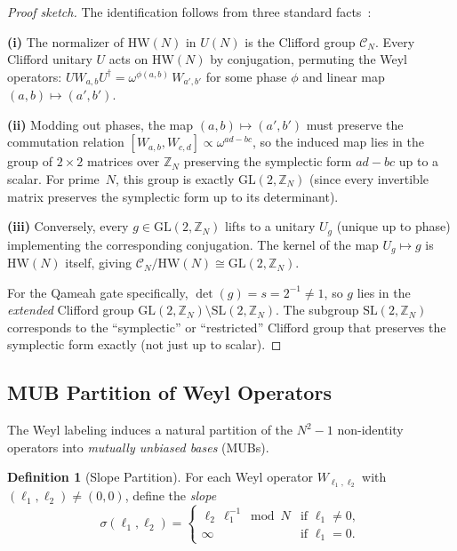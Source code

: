 \documentclass[aip,jmp,reprint,superscriptaddress,floatfix,nofootinbib]{revtex4-2}
\theoremstyle{definition}
\newtheorem{definition}[theorem]{Definition}
\theoremstyle{remark}
\newcommand{\ZN}{\mathbb{Z}_N}
\newcommand{\GL}{\mathrm{GL}}
\newcommand{\SL}{\mathrm{SL}}
\newcommand{\HW}{\mathrm{HW}}
\begin{document}
\begin{proof}[Proof sketch]
The identification follows from three standard
facts~\cite{Appleby2005, Gross2006}:

\textbf{(i)} The normalizer of $\HW(N)$ in $U(N)$ is the Clifford
group $\mathcal{C}_N$.  Every Clifford unitary $U$ acts on $\HW(N)$
by conjugation, permuting the Weyl operators: $U W_{a,b} U^\dagger =
\omega^{\phi(a,b)}\, W_{a',b'}$ for some phase $\phi$ and linear map
$(a,b) \mapsto (a',b')$.

\textbf{(ii)} Modding out phases, the map $(a,b) \mapsto (a',b')$
must preserve the commutation relation $[W_{a,b}, W_{c,d}] \propto
\omega^{ad - bc}$, so the induced map lies in the group of
$2 \times 2$ matrices over $\ZN$ preserving the symplectic form
$ad - bc$ up to a scalar.  For prime~$N$, this group is exactly
$\GL(2,\ZN)$ (since every invertible matrix preserves the symplectic
form up to its determinant).

\textbf{(iii)} Conversely, every $g \in \GL(2,\ZN)$ lifts to a
unitary $U_g$ (unique up to phase) implementing the corresponding
conjugation.  The kernel of the map $U_g \mapsto g$ is $\HW(N)$
itself, giving $\mathcal{C}_N / \HW(N) \cong \GL(2,\ZN)$.

For the Qameah gate specifically, $\det(g) = s = 2^{-1} \ne 1$, so
$g$ lies in the \emph{extended} Clifford group
$\GL(2,\ZN) \setminus \SL(2,\ZN)$.  The subgroup $\SL(2,\ZN)$
corresponds to the ``symplectic'' or ``restricted'' Clifford group
that preserves the symplectic form exactly (not just up to scalar).
\end{proof}

\subsection{MUB Partition of Weyl Operators}
\label{sec:gl2:mub}

The Weyl labeling induces a natural partition of the $N^2 - 1$
non-identity operators into \emph{mutually unbiased bases} (MUBs).

\begin{definition}[Slope Partition]\label{def:slope}
For each Weyl operator $W_{\ell_1,\ell_2}$ with $(\ell_1,\ell_2)
\ne (0,0)$, define the \emph{slope}
\begin{equation}\label{eq:slope}
\sigma(\ell_1, \ell_2) =
\begin{cases}
\ell_2\,\ell_1^{-1} \bmod N & \text{if } \ell_1 \ne 0,\\
\infty & \text{if } \ell_1 = 0.
\end{cases}
\end{equation}
\end{definition}
\end{document}
